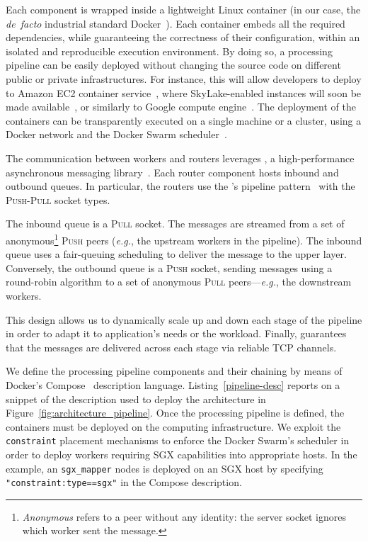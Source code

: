 Each component is wrapped inside a lightweight Linux container (in our case, the \emph{de~facto} industrial standard Docker~\cite{docker}).
Each container embeds all the required dependencies, while guaranteeing the correctness of their configuration, within an isolated and reproducible execution environment.
By doing so, a \SS{} processing pipeline can be easily deployed without changing the source code on different public or private infrastructures.
For instance, this will allow developers to deploy \SS{} to Amazon EC2 container service~\cite{awsec2container}, where SkyLake-enabled instances will soon be made available~\cite{amazonskylake}, or similarly to Google compute engine~\cite{gceskylake}.
The deployment of the containers can be transparently executed on a single machine or a cluster, using a Docker network and the Docker Swarm scheduler~\cite{docker:swarm_2016}.

The communication between workers and routers leverages \zmq{}, a high-performance asynchronous messaging library~\cite{zero_mq}.
Each router component hosts inbound and outbound queues.
In particular, the routers use the \zmq's pipeline pattern~\cite{zero_mq:pipeline} with the \textsc{Push}-\textsc{Pull} socket types.

The inbound queue is a \textsc{Pull} socket.
The messages are streamed from a set of anonymous\footnote{\emph{Anonymous} refers to a peer without any identity: the server socket ignores which worker sent the message.} \textsc{Push} peers (\textit{e.g.}, the upstream workers in the pipeline).
The inbound queue uses a fair-queuing scheduling to deliver the message to the upper layer.
Conversely, the outbound queue is a \textsc{Push} socket, sending messages using a round-robin algorithm to a set of anonymous \textsc{Pull} peers---\textit{e.g.}, the downstream workers.

This design allows us to dynamically scale up and down each stage of the pipeline in order to adapt it to application's needs or the workload.
Finally, \zmq{} guarantees that the messages are delivered across each stage via reliable TCP channels.

We define the processing pipeline components and their chaining by means of Docker's Compose~\cite{docker:compose} description language.
Listing~\ref{pipeline-desc} reports on a snippet of the description used to deploy the architecture in Figure~\ref{fig:architecture_pipeline}.
Once the processing pipeline is defined, the containers must be deployed on the computing infrastructure.
We exploit the \texttt{constraint} placement mechanisms to enforce the Docker Swarm's scheduler in order to deploy workers requiring SGX capabilities into appropriate hosts.
In the example, an \texttt{sgx\_mapper} nodes is deployed on an SGX host by specifying \texttt{"constraint:type==sgx"} in the Compose description.




